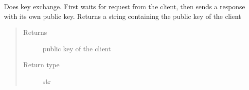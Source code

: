 \documentclass[letterpaper,10pt,english]{sphinxmanual}
\begin{document}
\begin{fulllineitems}
\begin{fulllineitems}
\label{\detokenize{Message:Message.Message._send_rcvr_key}}
\end{fulllineitems}


\begin{fulllineitems}
\label{\detokenize{Message:Message.Message.keyex}}
Does key exchange. First waits for request from the client, then sends a response with its own public key. Returns a string containing the public key of the client
\begin{quote}\begin{description}
\item[{Returns}] \leavevmode
public key of the client

\item[{Return type}] \leavevmode
str

\end{description}\end{quote}

\end{fulllineitems}


\begin{fulllineitems}
\label{\detokenize{Message:Message.Message._process_login}}
\end{fulllineitems}


\begin{fulllineitems}
\label{\detokenize{Message:Message.Message._login_failed}}
\end{fulllineitems}


\begin{fulllineitems}
\label{\detokenize{Message:Message.Message._login_successful}}
\end{fulllineitems}


\end{fulllineitems}
\end{document}

